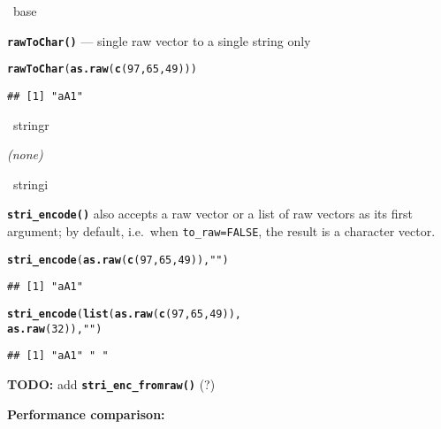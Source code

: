 \documentclass[11pt]{article}\usepackage[]{graphicx}\usepackage[]{color}
\makeatletter
\newcommand{\hlnum}[1]{\textcolor[rgb]{0.686,0.059,0.569}{#1}}%
\newcommand{\hlstr}[1]{\textcolor[rgb]{0.192,0.494,0.8}{#1}}%
\newcommand{\hlstd}[1]{\textcolor[rgb]{0.345,0.345,0.345}{#1}}%
\newcommand{\hlkwc}[1]{\textcolor[rgb]{0.333,0.667,0.333}{#1}}%
\newcommand{\hlkwd}[1]{\textcolor[rgb]{0.737,0.353,0.396}{\textbf{#1}}}%
\newenvironment{kframe}{%
 \def\at@end@of@kframe{}%
 \ifinner\ifhmode%
  \def\at@end@of@kframe{\end{minipage}}%
  \begin{minipage}{\columnwidth}%
 \fi\fi%
 \def\FrameCommand##1{\hskip\@totalleftmargin \hskip-\fboxsep
 \colorbox{shadecolor}{##1}\hskip-\fboxsep
     \hskip-\linewidth \hskip-\@totalleftmargin \hskip\columnwidth}%
 \MakeFramed {\advance\hsize-\width
   \@totalleftmargin\z@ \linewidth\hsize
   \@setminipage}}%
 {\par\unskip\endMakeFramed%
 \at@end@of@kframe}
\newenvironment{knitrout}{}{} %
\newcommand{\package}[1]{\textsf{#1}\xspace}
\newcommand{\func}[1]{\texttt{\hlkwd{#1}}}
\newcommand{\argument}[1]{\texttt{\hlkwc{#1}}}
\newcommand{\ColumnOne}{\begin{minipage}[t]{0.32\textwidth}
   \hrulefill~\package{base}~\hrulefill

   \medskip}
\newcommand{\ColumnTwo}{\vfill\end{minipage}\hspace*{0.02\textwidth}%
\begin{minipage}[t]{0.32\textwidth}
   \hrulefill~\package{stringr}~\hrulefill

   \medskip}
\newcommand{\ColumnThree}{\vfill\end{minipage}\hspace*{0.02\textwidth}%
\begin{minipage}[t]{0.32\textwidth}
   \hrulefill~\package{stringi}~\hrulefill

   \medskip}
\newcommand{\ColumnEnd}{\vfill\end{minipage}}
\makeatother
\begin{document}
\ColumnOne
   \func{rawToChar()} --- single raw vector to a single string only

\begin{knitrout}\small
{}\color{fgcolor}\begin{kframe}
\begin{alltt}
\hlkwd{rawToChar}\hlstd{(}\hlkwd{as.raw}\hlstd{(}\hlkwd{c}\hlstd{(}\hlnum{97}\hlstd{,} \hlnum{65}\hlstd{,} \hlnum{49}\hlstd{)))}
\end{alltt}
\begin{verbatim}
## [1] "aA1"
\end{verbatim}
\end{kframe}
\end{knitrout}

\ColumnTwo

\textit{(none)}

\ColumnThree
   \func{stri\_encode()} also accepts a raw vector
   or a list of raw vectors as its first argument;
   by default, i.e.~when \texttt{\argument{to\_raw}=FALSE},
   the result is a character vector.

\begin{knitrout}\small
{}\color{fgcolor}\begin{kframe}
\begin{alltt}
\hlkwd{stri_encode}\hlstd{(}\hlkwd{as.raw}\hlstd{(}\hlkwd{c}\hlstd{(}\hlnum{97}\hlstd{,} \hlnum{65}\hlstd{,} \hlnum{49}\hlstd{)),} \hlstr{""}\hlstd{)}
\end{alltt}
\begin{verbatim}
## [1] "aA1"
\end{verbatim}
\begin{alltt}
\hlkwd{stri_encode}\hlstd{(}\hlkwd{list}\hlstd{(}\hlkwd{as.raw}\hlstd{(}\hlkwd{c}\hlstd{(}\hlnum{97}\hlstd{,} \hlnum{65}\hlstd{,} \hlnum{49}\hlstd{)),}
   \hlkwd{as.raw}\hlstd{(}\hlnum{32}\hlstd{)),} \hlstr{""}\hlstd{)}
\end{alltt}
\begin{verbatim}
## [1] "aA1" " "
\end{verbatim}
\end{kframe}
\end{knitrout}


{\bfseries TODO:} add \func{stri\_enc\_fromraw()} (?)

\ColumnEnd

\bigskip
\noindent\textbf{Performance comparison:}
\end{document}
